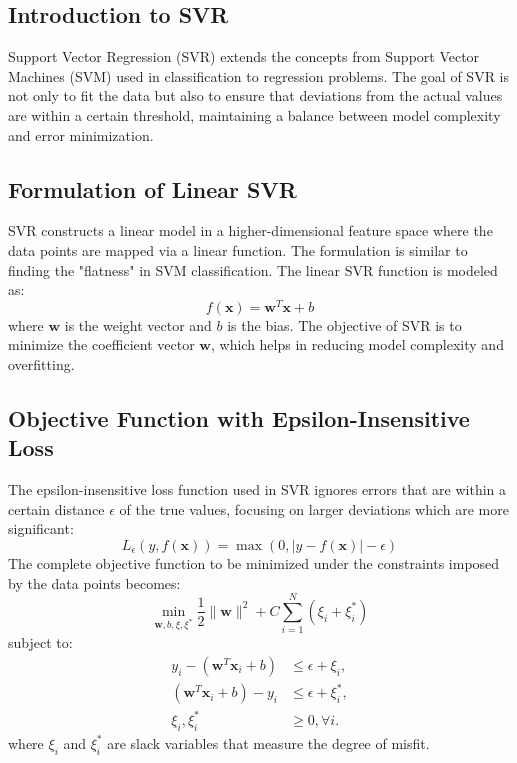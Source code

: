 \documentclass[12pt]{article}
\begin{document}
\subsection{Introduction to SVR}
Support Vector Regression (SVR) extends the concepts from Support Vector Machines (SVM) used in classification to regression problems. The goal of SVR is not only to fit the data but also to ensure that deviations from the actual values are within a certain threshold, maintaining a balance between model complexity and error minimization.

\subsection{Formulation of Linear SVR}
SVR constructs a linear model in a higher-dimensional feature space where the data points are mapped via a linear function. The formulation is similar to finding the "flatness" in SVM classification. The linear SVR function is modeled as:
\begin{equation}
f(\mathbf{x}) = \mathbf{w}^T \mathbf{x} + b
\end{equation}
where $\mathbf{w}$ is the weight vector and $b$ is the bias. The objective of SVR is to minimize the coefficient vector $\mathbf{w}$, which helps in reducing model complexity and overfitting.

\subsection{Objective Function with Epsilon-Insensitive Loss}
The epsilon-insensitive loss function used in SVR ignores errors that are within a certain distance $\epsilon$ of the true values, focusing on larger deviations which are more significant:
\begin{equation}
L_\epsilon(y, f(\mathbf{x})) = \max(0, |y - f(\mathbf{x})| - \epsilon)
\end{equation}
The complete objective function to be minimized under the constraints imposed by the data points becomes:
\begin{equation}
\min_{\mathbf{w}, b, \xi, \xi^*} \frac{1}{2} \|\mathbf{w}\|^2 + C \sum_{i=1}^N (\xi_i + \xi_i^*)
\end{equation}
subject to:
\begin{align*}
y_i - (\mathbf{w}^T \mathbf{x}_i + b) &\leq \epsilon + \xi_i, \\
(\mathbf{w}^T \mathbf{x}_i + b) - y_i &\leq \epsilon + \xi_i^*, \\
\xi_i, \xi_i^* &\geq 0, \forall i.
\end{align*}
where $\xi_i$ and $\xi_i^*$ are slack variables that measure the degree of misfit.
\end{document}
